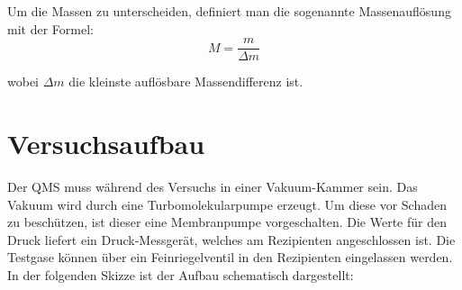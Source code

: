 

Um die Massen zu unterscheiden, definiert man die sogenannte Massenauflösung mit der Formel:
\begin{equation}
M = \frac{m}{\Delta m}
\end{equation} 

wobei $\Delta m$ die kleinste  auflösbare Massendifferenz ist.

\section{Versuchsaufbau}
Der QMS muss während des Versuchs in einer Vakuum-Kammer sein. Das Vakuum wird durch eine Turbomolekularpumpe erzeugt. Um diese vor Schaden zu beschützen, ist dieser eine Membranpumpe vorgeschalten. Die Werte für den Druck liefert ein Druck-Messgerät, welches am Rezipienten angeschlossen ist. Die Testgase können über ein Feinriegelventil in den Rezipienten eingelassen werden. In der folgenden Skizze ist der Aufbau schematisch dargestellt:


